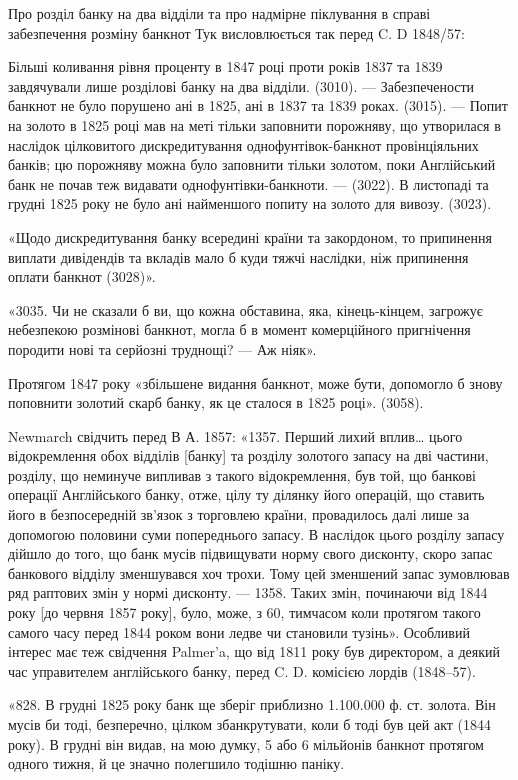 
Про розділ банку на два відділи та про надмірне піклування в справі забезпечення
розміну банкнот Тук висловлюється так перед C. D 1848/57:

Більші коливання рівня проценту в 1847 році проти років 1837 та 1839
завдячували лише розділові банку на два відділи. (3010). — Забезпечености банкнот
не було порушено ані в 1825, ані в 1837 та 1839 роках. (3015). — Попит
на золото в 1825 році мав на меті тільки заповнити порожняву, що утворилася
в наслідок цілковитого дискредитування однофунтівок-банкнот провінціяльних
банків; цю порожняву можна було заповнити тільки золотом, поки Англійський
банк не почав теж видавати однофунтівки-банкноти. — (3022). В листопаді та
грудні 1825 року не було ані найменшого попиту на золото для вивозу. (3023).

«Щодо дискредитування банку всередині країни та закордоном, то припинення
виплати дивідендів та вкладів мало б куди тяжчі наслідки, ніж припинення
оплати банкнот (3028)».

«3035. Чи не сказали б ви, що кожна обставина, яка, кінець-кінцем,
загрожує небезпекою розмінові банкнот, могла б в момент комерційного пригнічення
породити нові та серйозні труднощі? — Аж ніяк».

Протягом 1847 року «збільшене видання банкнот, може бути, допомогло б
знову поповнити золотий скарб банку, як це сталося в 1825 році». (3058).

Newmarch свідчить перед В А. 1857: «1357. Перший лихий вплив\dots{}
цього відокремлення обох відділів [банку] та розділу золотого запасу на дві частини,
розділу, що неминуче випливав з такого відокремлення, був той, що банкові
операції Англійського банку, отже, цілу ту ділянку його операцій, що ставить
його в безпосередній зв’язок з торговлею країни, провадилось далі лише за допомогою
половини суми попереднього запасу. В наслідок цього розділу запасу
дійшло до того, що банк мусів підвищувати норму свого дисконту, скоро запас
банкового відділу зменшувався хоч трохи. Тому цей зменшений запас зумовлював
ряд раптових змін у нормі дисконту. — 1358. Таких змін, починаючи від
1844 року [до червня 1857 року], було, може, з 60, тимчасом коли протягом
такого самого часу перед 1844 роком вони ледве чи становили тузінь». Особливий
інтерес має теж свідчення Palmer’a, що від 1811 року був директором, а
деякий час управителем англійського банку, перед C. D. комісією лордів (1848--57).

«828. В грудні 1825 року банк ще зберіг приблизно \num{1.100.000} ф. ст.
золота. Він мусів би тоді, безперечно, цілком збанкрутувати, коли б тоді був
цей акт (1844 року). В грудні він видав, на мою думку, 5 або 6 мільйонів
банкнот протягом одного тижня, й це значно полегшило тодішню паніку.

